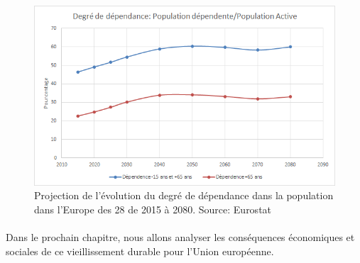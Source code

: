 \begin{figure}[h!]
    \begin{center}
        \includegraphics[scale=0.6]{document/dependance.png}
        \caption{Projection de l'évolution du degré de dépendance dans la population dans l'Europe des 28 de 2015 à 2080. Source: Eurostat~\citep{eurostat_europop13}}
        \label{dependance}
    \end{center}
\end{figure}

\paragraph{}Dans le prochain chapitre, nous allons analyser les conséquences économiques et sociales de ce vieillissement durable pour l’Union européenne.
